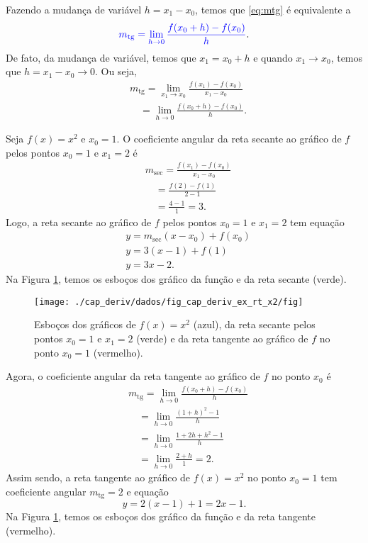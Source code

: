 \begin{obs}
  Fazendo a mudança de variável $h = x_1-x_0$, temos que \eqref{eq:mtg} é equivalente a
  \begin{equation}
    {\color{blue}m_{\text{tg}} = \lim_{h\to 0} \frac{f(x_0+h)-f(x_0)}{h}}.
  \end{equation}
  De fato, da mudança de variável, temos que $x_1 = x_0+h$ e quando $x_1\to x_0$, temos que $h = x_1-x_0\to 0$. Ou seja,
  \begin{align}
    & m_{\text{tg}} = \lim_{x_1\to x_0} \frac{f(x_1)-f(x_0)}{x_1-x_0}\\
    & \text{}\quad = \lim_{h\to 0} \frac{f(x_0+h)-f(x_0)}{h}.
  \end{align}
\end{obs}

\begin{ex}
  Seja $f(x)=x^2$ e $x_0 = 1$. O coeficiente angular da reta secante ao gráfico de $f$ pelos pontos $x_0=1$ e $x_1 = 2$ é
  \begin{align}
    & m_{\text{sec}} = \frac{f(x_1)-f(x_0)}{x_1-x_0}\\
    & \text{}\quad = \frac{f(2) - f(1)}{2-1}\\
    & \text{}\quad = \frac{4-1}{1} = 3.
  \end{align}
  Logo, a reta secante ao gráfico de $f$ pelos pontos $x_0=1$ e $x_1=2$ tem equação
  \begin{align}
    & y = m_{\text{sec}}(x-x_0) + f(x_0) \\
    & y = 3(x-1)+f(1) \\
    & y = 3x - 2.
  \end{align}
  Na Figura \ref{fig:cap_deriv_ex_rt_x2}, temos os esboços dos gráfico da função e da reta secante (verde).
  
  \begin{figure}[H]
    \centering
    \texttt{[image: ./cap\_deriv/dados/fig\_cap\_deriv\_ex\_rt\_x2/fig]}
    \caption{Esboços dos gráficos de $f(x)=x^2$ (azul), da reta secante pelos pontos $x_0=1$ e $x_1=2$ (verde) e da reta tangente ao gráfico de $f$ no ponto $x_0 = 1$ (vermelho).}
    \label{fig:cap_deriv_ex_rt_x2}
  \end{figure}

  Agora, o coeficiente angular da reta tangente ao gráfico de $f$ no ponto $x_0$ é
  \begin{align}
    & m_{\text{tg}} = \lim_{h\to 0} \frac{f(x_0+h)-f(x_0)}{h}\\
    & \text{}\quad = \lim_{h\to 0} \frac{(1+h)^2-1}{h}\\
    & \text{}\quad = \lim_{h\to 0} \frac{1+2h+h^2-1}{h}\\
    & \text{}\quad = \lim_{h\to 0} \frac{2+h}{1} = 2.
  \end{align}
  Assim sendo, a reta tangente ao gráfico de $f(x)=x^2$ no ponto $x_0=1$ tem coeficiente angular $m_{\text{tg}} = 2$ e equação
  \begin{equation}
    y = 2(x-1)+1 = 2x-1.
  \end{equation}
  Na Figura \ref{fig:cap_deriv_ex_rt_x2}, temos os esboços dos gráfico da função e da reta tangente (vermelho).
  

\end{ex}
